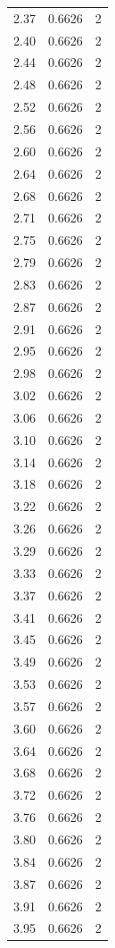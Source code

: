 \begin{longtable}{lrr}
  2.37 & 0.6626 & 2 \\
  2.40 & 0.6626 & 2 \\
  2.44 & 0.6626 & 2 \\
  2.48 & 0.6626 & 2 \\
  2.52 & 0.6626 & 2 \\
  2.56 & 0.6626 & 2 \\
  2.60 & 0.6626 & 2 \\
  2.64 & 0.6626 & 2 \\
  2.68 & 0.6626 & 2 \\
  2.71 & 0.6626 & 2 \\
  2.75 & 0.6626 & 2 \\
  2.79 & 0.6626 & 2 \\
  2.83 & 0.6626 & 2 \\
  2.87 & 0.6626 & 2 \\
  2.91 & 0.6626 & 2 \\
  2.95 & 0.6626 & 2 \\
  2.98 & 0.6626 & 2 \\
  3.02 & 0.6626 & 2 \\
  3.06 & 0.6626 & 2 \\
  3.10 & 0.6626 & 2 \\
  3.14 & 0.6626 & 2 \\
  3.18 & 0.6626 & 2 \\
  3.22 & 0.6626 & 2 \\
  3.26 & 0.6626 & 2 \\
  3.29 & 0.6626 & 2 \\
  3.33 & 0.6626 & 2 \\
  3.37 & 0.6626 & 2 \\
  3.41 & 0.6626 & 2 \\
  3.45 & 0.6626 & 2 \\
  3.49 & 0.6626 & 2 \\
  3.53 & 0.6626 & 2 \\
  3.57 & 0.6626 & 2 \\
  3.60 & 0.6626 & 2 \\
  3.64 & 0.6626 & 2 \\
  3.68 & 0.6626 & 2 \\
  3.72 & 0.6626 & 2 \\
  3.76 & 0.6626 & 2 \\
  3.80 & 0.6626 & 2 \\
  3.84 & 0.6626 & 2 \\
  3.87 & 0.6626 & 2 \\
  3.91 & 0.6626 & 2 \\
  3.95 & 0.6626 & 2 \\

\end{longtable}
